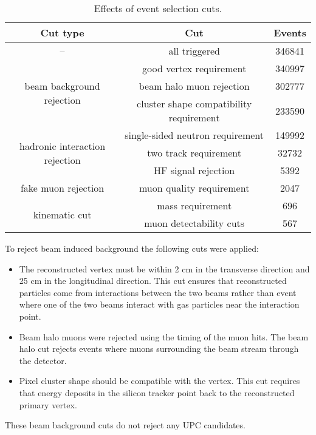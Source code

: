 \DIFdelend \DIFaddbegin \begin{table}[!Hhbt]
        \DIFaddendFL \centering
        \begin{tabular}{|c|c|c|} \hline 
          Cut type & Cut & Events \\ \hline
          -- & all triggered & 346841 \\ \hline
          \multirow{3}{*}{beam background rejection} & good vertex requirement & 340997 \\ \hhline{~--}
          & beam halo muon rejection & 302777 \\ \hhline{~--}
          & cluster shape compatibility requirement & 233590 \\ \hline
          \multirow{3}{*}{hadronic interaction rejection} & single-sided neutron requirement & 149992 \\ \hhline{~--}
          & two track requirement & 32732 \\ \hhline{~--}
          & HF signal rejection & 5392 \\ \hline
          fake muon rejection & muon quality requirement & 2047 \\ \hline
          \multirow{2}{*}{kinematic cut} & \JPsi{} mass requirement & 696 \\ \hhline{~--}
          & muon detectability cuts & 567 \\ \hline
        \end{tabular}
        \caption{Effects of event selection cuts.}
        \label{tab:evSelCutNumbers}
      \end{table}

      To reject beam induced background the following cuts were applied:
      \begin{itemize}
        \item The reconstructed vertex must be within 2 cm in 
          the transverse direction and 25 cm in the 
          longitudinal direction. This cut ensures that reconstructed particles 
          come from interactions between the two beams rather than event where 
          one of the two beams interact with gas particles near the interaction 
          point. 
  	    \item Beam halo muons were rejected using the timing of the muon hits.
          The beam halo cut rejects events where muons surrounding the beam 
          stream through the detector. 
  	    \item Pixel cluster shape should be compatible with the vertex. 
          This cut requires that energy deposits in the silicon tracker point 
            back to the reconstructed  primary vertex. 
      \end{itemize}
      These beam background cuts do not reject any UPC \JPsi{} candidates. 

